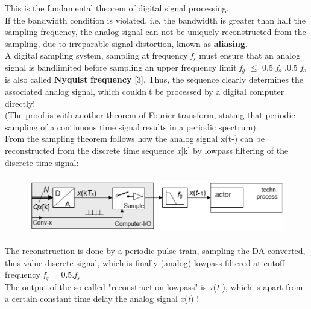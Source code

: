 This is the fundamental theorem of digital signal processing.\\

If the bandwidth condition is violated, i.e. the bandwidth is greater than half the sampling frequency, the analog signal can not be uniquely reconstructed from the sampling, due to irreparable signal distortion, known as \textbf{aliasing}.\\

A digital sampling system, sampling at frequency \textit{f${}_{s}$} must ensure that an analog signal is bandlimited before sampling an upper frequency limit \textit{f${}_{g}$} $\mathrm{\le}$ 0.5\textit{ f${}_{s}$} .0.5\textit{ f${}_{s}$} is also called \textbf{Nyquist} \textbf{frequency} [3]. Thus, the sequence clearly determines the associated analog signal, which couldn't be processed by a digital computer directly!\\

(The proof is with another theorem of Fourier transform, stating that periodic sampling of a continuous time signal results in a periodic spectrum).\\

From the sampling theorem follows how the analog signal x(t-) can be reconstructed from the discrete time sequence \textit{x}[k]  by lowpass filtering of the discrete time signal:\\

    \begin{figure}[h]
    \centering
    \includegraphics[width=14cm, height=2.5cm]{Images/image138.png}
    \label{fig:Fig 90}
    \end{figure}

The reconstruction is done by a periodic pulse train, sampling the DA converted, thus value discrete signal, which is finally (analog) lowpass filtered at cutoff frequency \textit{f}${}_{g}$ = 0.5$.$\textit{f}${}_{s}$\\ 

The output of the so-called "reconstruction lowpass" is \textit{x}(\textit{t}-), which is apart from a certain constant time delay  the analog signal \textit{x}(\textit{t}) !\\

